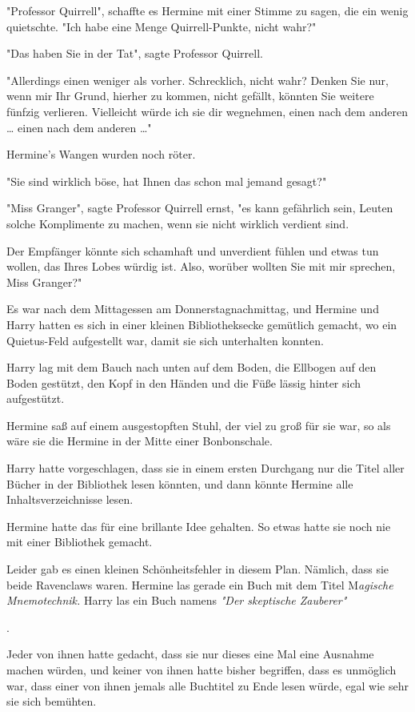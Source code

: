 {"Professor Quirrell", schaffte es Hermine mit einer Stimme zu sagen, die ein wenig quietschte. "Ich habe eine Menge Quirrell-Punkte, nicht wahr?"

"Das haben Sie in der Tat", sagte Professor Quirrell.

"Allerdings einen weniger als vorher. Schrecklich, nicht wahr? Denken Sie nur, wenn mir Ihr Grund, hierher zu kommen, nicht gefällt, könnten Sie weitere fünfzig verlieren. Vielleicht würde ich sie dir wegnehmen, einen nach dem anderen … einen nach dem anderen …"

Hermine's Wangen wurden noch röter.

"Sie sind wirklich böse, hat Ihnen das schon mal jemand gesagt?"

"Miss Granger", sagte Professor Quirrell ernst, "es kann gefährlich sein, Leuten solche Komplimente zu machen, wenn sie nicht wirklich verdient sind.

Der Empfänger könnte sich schamhaft und unverdient fühlen und etwas tun wollen, das Ihres Lobes würdig ist. Also, worüber wollten Sie mit mir sprechen, Miss Granger?"

Es war nach dem Mittagessen am Donnerstagnachmittag, und Hermine und Harry hatten es sich in einer kleinen Bibliotheksecke gemütlich gemacht, wo ein Quietus-Feld aufgestellt war, damit sie sich unterhalten konnten.

Harry lag mit dem Bauch nach unten auf dem Boden, die Ellbogen auf den Boden gestützt, den Kopf in den Händen und die Füße lässig hinter sich aufgestützt.

Hermine saß auf einem ausgestopften Stuhl, der viel zu groß für sie war, so als wäre sie die Hermine in der Mitte einer Bonbonschale.

Harry hatte vorgeschlagen, dass sie in einem ersten Durchgang nur die Titel aller Bücher in der Bibliothek lesen könnten, und dann könnte Hermine alle Inhaltsverzeichnisse lesen.

Hermine hatte das für eine brillante Idee gehalten. So etwas hatte sie noch nie mit einer Bibliothek gemacht.

Leider gab es einen kleinen Schönheitsfehler in diesem Plan. Nämlich, dass sie beide Ravenclaws waren. Hermine las gerade ein Buch mit dem Titel M\emph{agische Mnemotechnik.} Harry las ein Buch namens \emph{"Der skeptische Zauberer"}

.

Jeder von ihnen hatte gedacht, dass sie nur dieses eine Mal eine Ausnahme machen würden, und keiner von ihnen hatte bisher begriffen, dass es unmöglich war, dass einer von ihnen jemals alle Buchtitel zu Ende lesen würde, egal wie sehr sie sich bemühten.

}

